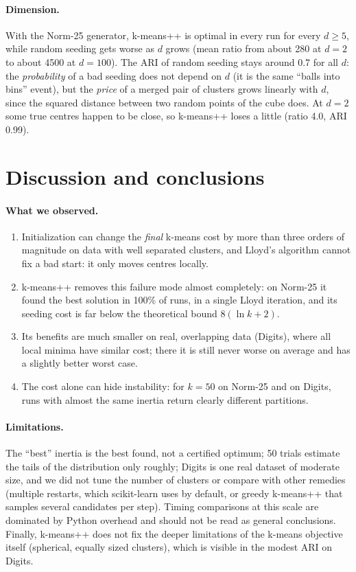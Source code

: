 \documentclass[11pt,a4paper]{article}
\begin{document}
\paragraph{Dimension.} With the Norm-25 generator, k-means++ is optimal in every
run for every $d\ge5$, while random seeding gets worse as $d$ grows (mean ratio
from about 280 at $d=2$ to about 4500 at $d=100$). The ARI of random seeding
stays around 0.7 for all $d$: the \emph{probability} of a bad seeding does not
depend on $d$ (it is the same ``balls into bins'' event), but the \emph{price} of
a merged pair of clusters grows linearly with $d$, since the squared distance
between two random points of the cube does. At $d=2$ some true centres happen to
be close, so k-means++ loses a little (ratio 4.0, ARI 0.99).

\section{Discussion and conclusions}

\paragraph{What we observed.}
\begin{enumerate}
\item Initialization can change the \emph{final} k-means cost by more than three
orders of magnitude on data with well separated clusters, and Lloyd's algorithm
cannot fix a bad start: it only moves centres locally.
\item k-means++ removes this failure mode almost completely: on Norm-25 it found
the best solution in 100\% of runs, in a single Lloyd iteration, and its seeding
cost is far below the theoretical bound $8(\ln k+2)$.
\item Its benefits are much smaller on real, overlapping data (Digits), where all
local minima have similar cost; there it is still never worse on average and has
a slightly better worst case.
\item The cost alone can hide instability: for $k=50$ on Norm-25 and on Digits,
runs with almost the same inertia return clearly different partitions.
\end{enumerate}

\paragraph{Limitations.} The ``best'' inertia is the best found, not a certified
optimum; 50 trials estimate the tails of the distribution only roughly; Digits is
one real dataset of moderate size, and we did not tune the number of clusters or
compare with other remedies (multiple restarts, which scikit-learn uses by
default, or greedy k-means++ that samples several candidates per step). Timing
comparisons at this scale are dominated by Python overhead and should not be read
as general conclusions. Finally, k-means++ does not fix the deeper limitations of
the k-means objective itself (spherical, equally sized clusters), which is visible
in the modest ARI on Digits.
\end{document}
